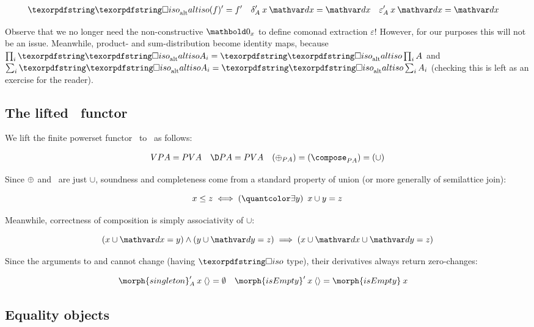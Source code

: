 \nopagebreak[2]
\begin{align*}
  \deriv{\altiso(f)} &= \deriv f
  & \deriv\delta_A \<x\<\dx &= \dx
  & \deriv\varepsilon_A \<x\<\dx &= \dx
\end{align*}

\noindent
Observe that we no longer need the non-constructive $\zero_x$ to define comonad
extraction $\varepsilon$! However, for our purposes this will not be an issue.
Meanwhile, product- and sum-distribution become identity maps, because $\prod_i
\altiso A_i = \altiso \prod_i A$ and $\sum_i \altiso A_i = \altiso \sum_i
A_i$ (checking this is left as an exercise for the reader).


\subsection{The lifted \pfin\ functor}
\label{sec:CP-pfin}

We lift the finite powerset functor \pfin\ to \CP\ as follows:

\nopagebreak[2]
\begin{align}
  \vals{\pfinof A} &= \pfinof{\vals A} &
  \chgs{\pfinof A} &= \pfinof{\vals A} &
  (\updfn_{\pfinof A}) = (\composefn_{\pfinof A}) = ({\cup})
  \label{eqn:CP-pfin}
\end{align}

\noindent Since ${\mathbin{\oplus}}$ and \composefn\ are just $\cup$, soundness and
completeness come from a standard property of union (or more generally of
semilattice join):

\nopagebreak[2]
\[ x \le z \iff \ex{y} x \cup y = z \]

\noindent Meanwhile, correctness of composition is simply associativity of
$\cup$:

\nopagebreak[2]
\[ (x \cup \dx = y) \wedge (y \cup \dy = z) \implies (x \cup \dx \cup \dy = z) \]

\noindent
Since the arguments to  and  cannot change
(having $\iso$ type), their derivatives always return zero-changes:

\nopagebreak[2]
\begin{align*}
  \deriv{\morph{singleton}}_A \<x \<\tuple{} &= \emptyset &
  \deriv{\morph{isEmpty}} \<x \<\tuple{} &= \morph{isEmpty} \< x
\end{align*}



\subsection{Equality objects}
\label{sec:CP-eq}

